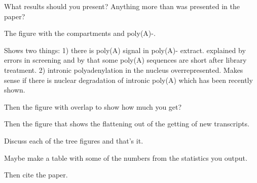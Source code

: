 %

What results should you present? Anything more than was presented in the paper?

The figure with the compartments and poly(A)-.

Shows two things: 1) there is poly(A) signal in poly(A)- extract. explained by
errors in screening and by that some poly(A) sequences are short after library
treatment. 2) intronic polyadenylation in the nucleus overrepresented. Makes
sense if there is nuclear degradation of intronic poly(A) which has been
recently shown.

Then the figure with overlap to show how much you get?

Then the figure that shows the flattening out of the getting of new
transcripts.

Discuss each of the tree figures and that's it.

Maybe make a table with some of the numbers from the statistics you output.

Then cite the paper.
